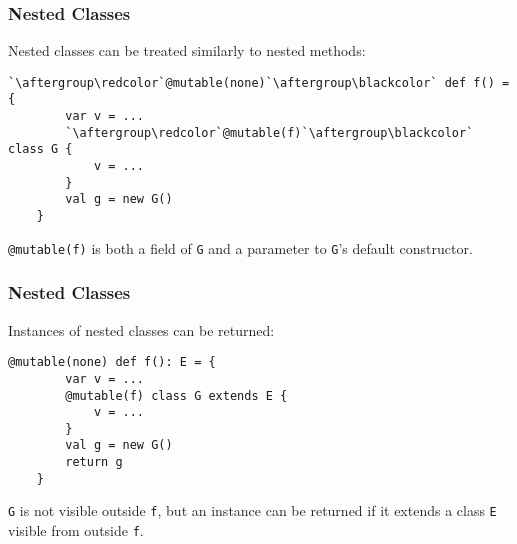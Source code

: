 \documentclass{beamer}
\newcommand{\code}[1]{\lstinline$#1$}
\begin{document}
\begin{frame}[containsverbatim]
\frametitle{Nested Classes}
Nested classes can be treated similarly to nested methods:
\begin{lstlisting}[escapechar=`]
	`\aftergroup\redcolor`@mutable(none)`\aftergroup\blackcolor` def f() = {
		var v = ...
		`\aftergroup\redcolor`@mutable(f)`\aftergroup\blackcolor` class G {
			v = ...
		}
		val g = new G()
	}
\end{lstlisting}
\code{@mutable(f)} is both a field of \code{G} and a parameter to \code{G}'s default constructor.
\end{frame}

\begin{frame}[containsverbatim]
\frametitle{Nested Classes}
Instances of nested classes can be returned:
\begin{lstlisting}[escapechar=`]
	@mutable(none) def f(): E = {
		var v = ...
		@mutable(f) class G extends E {
			v = ...
		}
		val g = new G()
		return g
	}
\end{lstlisting}
\code{G} is not visible outside \code{f}, but an instance can be returned if
it extends a class \code{E} visible from outside \code{f}.
\end{frame}

\begin{comment}
\begin{frame}[containsverbatim]
\frametitle{Partially-applied Functions}
\begin{lstlisting}[escapechar=`]
def f(package: @readonly):
		((`\aftergroup\redcolor`closure: @mutable, hidden: @mutable`\aftergroup\blackcolor`) => Unit) = {
	var v = ...
	def g(f: @mutable, package: @readonly) = {
		v = ...
	}
	`\aftergroup\redcolor`class anonymousClosure(f: @mutable, package: @readonly) {
		def apply(this: @mutable, f: @mutable) =
			g(f or this.f, this.package)
	}`\aftergroup\blackcolor`
	return `\aftergroup\redcolor`new anonymousClosure()`\aftergroup\blackcolor`
}
\end{lstlisting}
\end{frame}
\end{comment}
\end{document}
